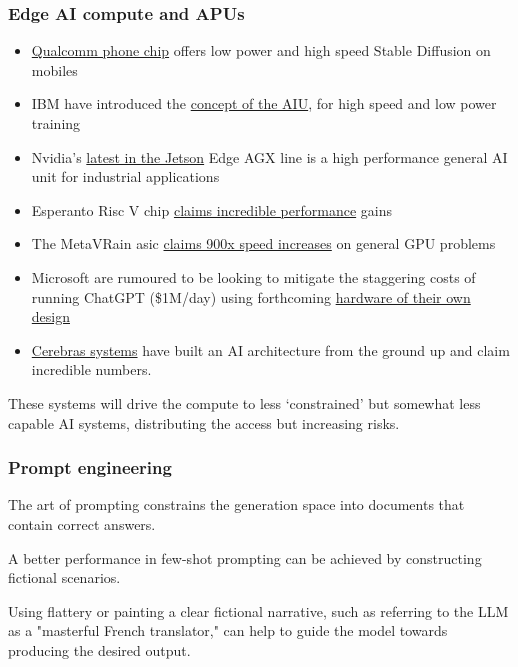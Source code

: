 \subsubsection{Edge AI compute and APUs}
\begin{itemize}
\item \href{https://www.theverge.com/2023/2/23/23611668/ai-image-stable-diffusion-mobile-android-qualcomm-fastest}{Qualcomm phone chip} offers low power and high speed Stable Diffusion on mobiles
\item IBM have introduced the \href{https://research.ibm.com/blog/ibm-artificial-intelligence-unit-aiu}{concept of the AIU}, for high speed and low power training
\item Nvidia's \href{https://www.okdo.com/p/nvidia-jetson-agx-orin-64gb-developer-kit/}{latest in the Jetson} Edge AGX line is a high performance general AI unit for industrial applications
\item Esperanto Risc V chip \href{https://www.esperanto.ai/News/risc-v-startup-esperanto-technologies-samples-first-ai-silicon/}{claims incredible performance} gains
\item The MetaVRain asic \href{https://hdh4797.wixsite.com/dhan/project-1}{claims 900x speed increases} on general GPU problems
\item Microsoft are rumoured to be looking to mitigate the staggering costs of running ChatGPT (\$1M/day) using forthcoming \href{https://www.theinformation.com/articles/microsoft-readies-ai-chip-as-machine-learning-costs-surge?}{hardware of their own design}
\item \href{https://www.cerebras.net/}{Cerebras systems} have built an AI architecture from the ground up and claim incredible numbers.
\end{itemize}
 These systems will drive the compute to less `constrained' but somewhat less capable AI systems, distributing the access but increasing risks.
\subsubsection{Prompt engineering}
The art of prompting constrains the generation space into documents that contain correct answers.

A better performance in few-shot prompting can be achieved by constructing fictional scenarios.

Using flattery or painting a clear fictional narrative, such as referring to the LLM as a "masterful French translator," can help to guide the model towards producing the desired output.

